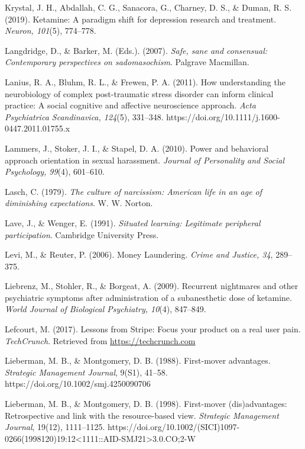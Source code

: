 \begin{thebibliography}{}
    Krystal, J. H., Abdallah, C. G., Sanacora, G., Charney, D. S., \& Duman, R. S. (2019). Ketamine: A paradigm shift for depression research and treatment. \textit{Neuron, 101}(5), 774–778.


    Langdridge, D., \& Barker, M. (Eds.). (2007). \textit{Safe, sane and consensual: Contemporary perspectives on sadomasochism}. Palgrave Macmillan.

    Lanius, R. A., Bluhm, R. L., \& Frewen, P. A. (2011). How understanding the neurobiology of complex post-traumatic stress disorder can inform clinical practice: A social cognitive and affective neuroscience approach. \textit{Acta Psychiatrica Scandinavica, 124}(5), 331–348. https://doi.org/10.1111/j.1600-0447.2011.01755.x

    Lammers, J., Stoker, J. I., \& Stapel, D. A. (2010). Power and behavioral approach orientation in sexual harassment. \textit{Journal of Personality and Social Psychology, 99}(4), 601–610.

    Lasch, C. (1979). \textit{The culture of narcissism: American life in an age of diminishing expectations}. W. W. Norton.
    
    Lave, J., \& Wenger, E. (1991). \textit{Situated learning: Legitimate peripheral participation}. Cambridge University Press.

    Levi, M., \& Reuter, P. (2006). Money Laundering. \textit{Crime and Justice, 34}, 289–375.

    Liebrenz, M., Stohler, R., \& Borgeat, A. (2009). Recurrent nightmares and other psychiatric symptoms after administration of a subanesthetic dose of ketamine. \textit{World Journal of Biological Psychiatry, 10}(4), 847–849.

    Lefcourt, M. (2017). Lessons from Stripe: Focus your product on a real user pain. \textit{TechCrunch}. Retrieved from \url{https://techcrunch.com}

    Lieberman, M. B., \& Montgomery, D. B. (1988). First-mover advantages. \textit{Strategic Management Journal}, 9(S1), 41–58. https://doi.org/10.1002/smj.4250090706

    Lieberman, M. B., \& Montgomery, D. B. (1998). First-mover (dis)advantages: Retrospective and link with the resource-based view. \textit{Strategic Management Journal}, 19(12), 1111–1125. https://doi.org/10.1002/(SICI)1097-0266(1998120)19:12<1111::AID-SMJ21>3.0.CO;2-W


\end{thebibliography}
